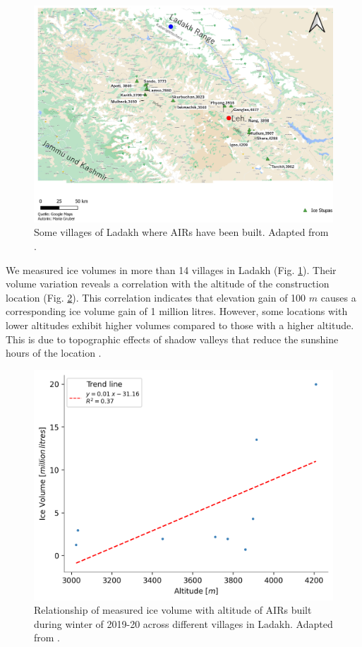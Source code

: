 \begin{figure}[htb]
	\includegraphics[width=\textwidth]{figs/ISC_villages}
	\caption{Some villages of Ladakh where \ac{AIRs} have been built. Adapted from \citet{mariagruberIceStupasLadakh2022}.}
	\label{fig:villages}
\end{figure}

We measured ice volumes in more than 14 villages in Ladakh (Fig. \ref{fig:villages}). Their volume variation
reveals a correlation with the altitude of the construction location (Fig. \ref{fig:altvsvol}). This correlation
indicates that elevation gain of 100 $m$ causes a corresponding ice volume gain of 1 million litres. However,
some locations with lower altitudes exhibit higher volumes compared to those with a higher altitude. This is due
to topographic effects of shadow valleys that reduce the sunshine hours of the location
\citep{mariagruberIceStupasLadakh2022}.

\begin{figure}[htb]
	\centering
	\includegraphics[width=\textwidth]{figs/altitudevsvolume.png}
	\caption{Relationship of measured ice volume with altitude of \ac{AIRs} built during winter of 2019-20 across
		different villages in Ladakh. Adapted from \citet{mariagruberIceStupasLadakh2022}.}
	\label{fig:altvsvol}
\end{figure}

